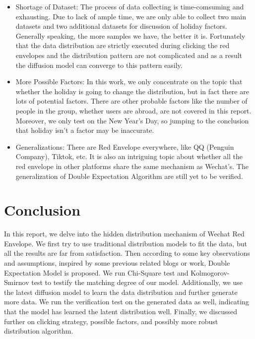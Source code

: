 \documentclass[11pt]{article}
\begin{document}
\begin{itemize}
    \item Shortage of Dataset: The process of data collecting is time-comsuming and exhausting. Due to lack of ample time, we are only able to collect two main datasets and two additional datasets for discussion of holiday factors. Generally speaking, the more samples we have, the better it is. Fortunately that the data distribution are strictly executed during clicking the red envelopes and the distribution pattern are not complicated and as a result the diffusion model can converge to this pattern easily.
    \item More Possible Factors: In this work, we only concentrate on the topic that whether the holiday is going to change the distribution, but in fact there are lots of potential factors. There are other probable factors like the number of people in the group, whether users are abroad, are not covered in this report. Moreover, we only test on the New Year's Day, so jumping to the conclusion that holiday isn't a factor may be inaccurate.
    \item Generalizations: There are Red Envelope everywhere, like QQ (Penguin Company), Tiktok, etc. It is also an intriguing topic about whether all the red envelope in other platforms share the same mechanism as Wechat's. The generalization of Double Expectation Algorithm are still yet to be verified.
\end{itemize}

\section*{Conclusion}

In this report, we delve into the hidden distribution mechanism of Wechat Red Envelope. We first try to use traditional distribution models to fit the data, but all the results are far from satisfaction. Then according to some key observations and assumptions, inspired by some previous related blogs or work, Double Expectation Model is proposed. We run Chi-Square test and Kolmogorov-Smirnov test to testify the matching degree of our model. Additionally, we use the latest diffusion model to learn the data distribution and further generate more data. We run the verification test on the generated data as well, indicating that the model has learned the latent distribution well. Finally, we discussed further on clicking strategy, possible factors, and possibly more robust distribution algorithm.
\end{document}
